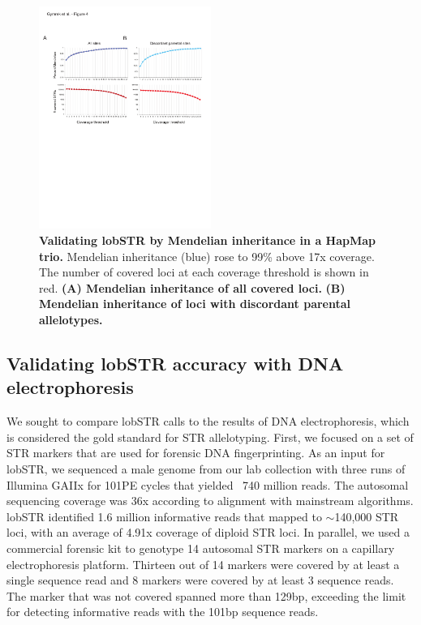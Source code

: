 \begin{figure}[h!]
\centering
\label{fig:lobfig4}
\includegraphics[width=0.5\textwidth]{Figures/Chapter2/Fig4.pdf}
\caption{\textbf{Validating lobSTR by Mendelian inheritance in a HapMap trio.} Mendelian inheritance (blue) rose to 99\% above 17x coverage. The number of covered loci at each coverage threshold is shown in red. \textbf{(A) Mendelian inheritance of all covered loci.} \textbf{(B) Mendelian inheritance of loci with discordant parental allelotypes.}}
\end{figure}

\subsection{Validating lobSTR accuracy with DNA electrophoresis}
We sought to compare lobSTR calls to the results of DNA electrophoresis, which is considered the gold standard for STR allelotyping. First, we focused on a set of STR markers that are used for forensic DNA fingerprinting. As an input for lobSTR, we sequenced a male genome from our lab collection with three runs of Illumina GAIIx for 101PE cycles that yielded ~740 million reads. The autosomal sequencing coverage was 36x according to alignment with mainstream algorithms. lobSTR identified 1.6 million informative reads that mapped to $\sim$140,000 STR loci, with an average of 4.91x coverage of diploid STR loci. In parallel, we used a commercial forensic kit to genotype 14 autosomal STR markers on a capillary electrophoresis platform. Thirteen out of 14 markers were covered by at least a single sequence read and 8 markers were covered by at least 3 sequence reads. The marker that was not covered spanned more than 129bp, exceeding the limit for detecting informative reads with the 101bp sequence reads.

